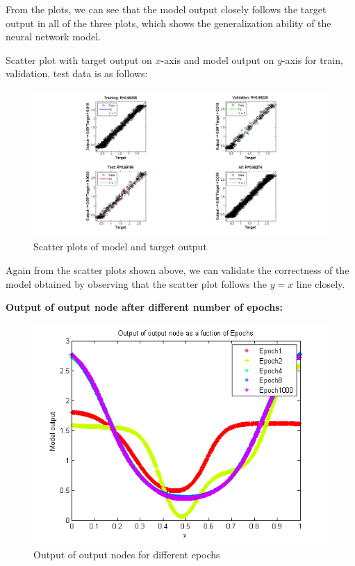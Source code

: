 \begin{flushleft}
From the plots, we can see that the model output closely follows the target output in all of the three plots, which shows the generalization ability of the neural network model.

Scatter plot with target output on $x$-axis and model output on $y$-axis for train, validation, test data is as follows:

\end{flushleft}

\begin{figure}[H]
\centering
\includegraphics[width=1.2\linewidth]{Regression/univariate/Scatter_plots.png}
\caption{Scatter plots of model and target output}
\end{figure}


\begin{flushleft}
Again from the scatter plots shown above, we can validate the correctness of the model obtained by observing that the scatter plot follows the $y = x$ line closely. 
\end{flushleft}
\newpage

\textbf{Output of output node after different number of epochs:}

\begin{figure}[H]
\centering
\includegraphics[width=0.6\linewidth]{Regression/univariate/epoch_output.png}
\caption{Output of output nodes for different epochs}
\end{figure}

